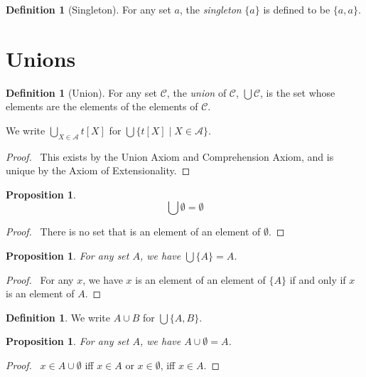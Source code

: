 \documentclass{report}
\let\qed\relax
\newtheorem{prop}[ax]{Proposition}
\theoremstyle{definition}
\newtheorem{df}[ax]{Definition}
\begin{document}
\begin{df}[Singleton]
For any set $a$, the \emph{singleton} $\{a\}$ is defined to be $\{a,a\}$.
\end{df}

\section{Unions}

\begin{df}[Union]
For any set $\mathcal{C}$, the \emph{union} of $\mathcal{C}$, $\bigcup \mathcal{C}$, is the set whose elements are the elements of the elements of $\mathcal{C}$.

We write $\bigcup_{X \in \mathcal{A}} t[X]$ for $\bigcup \{t[X] \mid X \in \mathcal{A} \}$.
\end{df}

\begin{proof}
\pf\ This exists by the Union Axiom and Comprehension Axiom, and is unique by the Axiom of Extensionality. \qed
\end{proof}

\begin{prop}
\[ \bigcup \emptyset = \emptyset \]
\end{prop}

\begin{proof}
\pf\ There is no set that is an element of an element of $\emptyset$. \qed
\end{proof}

\begin{prop}
For any set $A$, we have $\bigcup \{A\} = A$.
\end{prop}

\begin{proof}
\pf\ For any $x$, we have $x$ is an element of an element of $\{A\}$ if and only if $x$ is an element of $A$. \qed
\end{proof}

\begin{df}
We write $A \cup B$ for $\bigcup \{A,B\}$.
\end{df}

\begin{prop}
For any set $A$, we have $A \cup \emptyset = A$.
\end{prop}

\begin{proof}
\pf\ $x \in A \cup \emptyset$ iff $x \in A$ or $x \in \emptyset$, iff $x \in A$. \qed
\end{proof}
\end{document}
